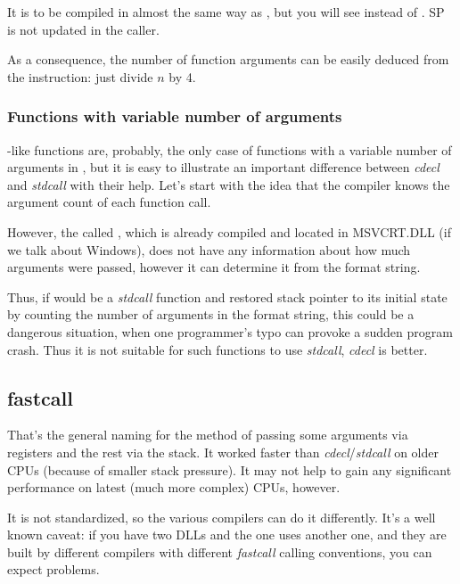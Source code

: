 It is to be compiled in almost the same way as , but you will see  instead of .
\ac{SP} is not updated in the \gls{caller}.

As a consequence, 
the number of function arguments can be easily deduced from the  instruction: just divide $n$ by 4.



\subsubsection{Functions with variable number of arguments}

\printf-like functions are, probably, the only case of functions with a variable number of arguments in \CCpp,
but it is easy to illustrate an important difference between \emph{cdecl} and \emph{stdcall} with their help.
Let's start with the idea that the compiler knows the argument count of each \printf function call.

However, the called \printf, which is already compiled and located in MSVCRT.DLL (if we talk about Windows),
does not have any information about how much arguments were passed, however it can determine it from the format string.

Thus, if \printf would be a \emph{stdcall} function and restored \gls{stack pointer} to its initial state by counting
the number of arguments in the format string, this could be a dangerous situation, when one programmer's typo can
provoke a sudden program crash.
Thus it is not suitable for such functions to use \emph{stdcall}, \emph{cdecl} is better.

\subsection{fastcall}
\label{fastcall}

That's the general naming for the method of passing some arguments via registers and the 
rest via the stack. It worked faster than \emph{cdecl}/\emph{stdcall} on older CPUs 
(because of smaller stack pressure).
It may not help to gain any significant performance on latest (much more complex) \ac{CPU}s, however.

It is not standardized, so the various compilers can do it differently.
It's a well known caveat: if you have two DLLs and the one uses another one, and they are built by different compilers with 
different \emph{fastcall} calling conventions, you can expect problems.

